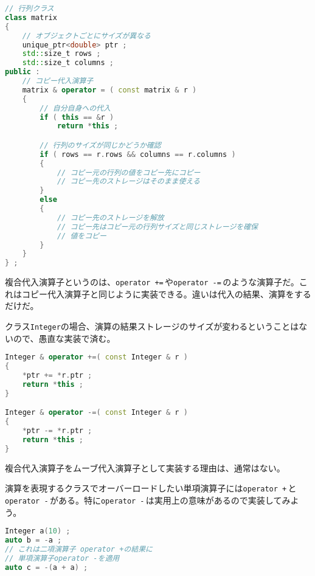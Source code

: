 \begin{lstlisting}[language={C++}]
// 行列クラス
class matrix
{
    // オブジェクトごとにサイズが異なる
    unique_ptr<double> ptr ;
    std::size_t rows ;
    std::size_t columns ;
public :
    // コピー代入演算子
    matrix & operator = ( const matrix & r )
    {
        // 自分自身への代入
        if ( this == &r )
            return *this ;

        // 行列のサイズが同じかどうか確認
        if ( rows == r.rows && columns == r.columns )
        {
            // コピー元の行列の値をコピー先にコピー
            // コピー先のストレージはそのまま使える
        }
        else
        {
            // コピー先のストレージを解放
            // コピー先はコピー元の行列サイズと同じストレージを確保
            // 値をコピー
        }
    }
} ;
\end{lstlisting}


複合代入演算子というのは、\texttt{operator +=}\,や\texttt{operator -=}\,のような演算子だ。これはコピー代入演算子と同じように実装できる。違いは代入の結果、演算をするだけだ。

クラス\texttt{Integer}の場合、演算の結果ストレージのサイズが変わるということはないので、愚直な実装で済む。

\begin{lstlisting}[language={C++}]
Integer & operator +=( const Integer & r )
{
    *ptr += *r.ptr ;
    return *this ;
}

Integer & operator -=( const Integer & r )
{
    *ptr -= *r.ptr ;
    return *this ;
}
\end{lstlisting}

複合代入演算子をムーブ代入演算子として実装する理由は、通常はない。

\clearpage
{}

演算を表現するクラスでオーバーロードしたい単項演算子には\texttt{operator +}\,と\texttt{operator -}\,がある。特に\texttt{operator -}\,は実用上の意味があるので実装してみよう。

\begin{lstlisting}[language={C++}]
Integer a(10) ;
auto b = -a ;
// これは二項演算子 operator +の結果に
// 単項演算子operator -を適用
auto c = -(a + a) ;
\end{lstlisting}

